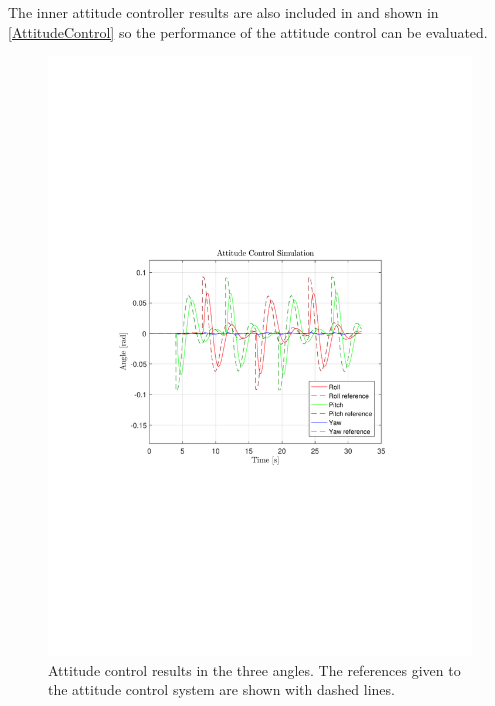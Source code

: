 The inner attitude controller results are also included in and shown in \autoref{AttitudeControl} so the performance of the attitude control can be evaluated. 
\begin{figure}[H]
	\centering
	\includegraphics[scale=0.25]{figures/AttitudeControl}
	\caption{Attitude control results in the three angles. The references given to the attitude control system are shown with dashed lines.}
	\label{AttitudeControl}
\end{figure}


